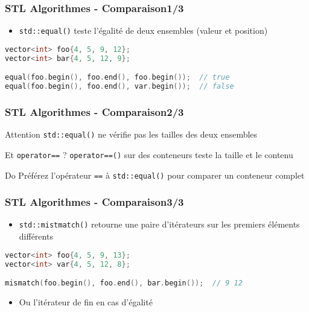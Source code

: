 \documentclass[C++.tex]{subfiles}
\begin{document}
\begin{frame}[fragile]
	\frametitle{STL Algorithmes - Comparaison\titlehfill{}1/3}
	\begin{itemize}
		\item \lstinline|std::equal()| teste l'égalité de deux ensembles (valeur et position)
	\end{itemize}


	\begin{lstlisting}[language=C++]
vector<int> foo{4, 5, 9, 12};
vector<int> bar{4, 5, 12, 9};

equal(foo.begin(), foo.end(), foo.begin());  // true
equal(foo.begin(), foo.end(), var.begin());  // false\end{lstlisting}
\end{frame}

\begin{frame}[fragile]
	\frametitle{STL Algorithmes - Comparaison\titlehfill{}2/3}
	\begin{alertblock}{Attention}
		\lstinline|std::equal()| ne vérifie pas les tailles des deux ensembles
	\end{alertblock}


	\begin{block}{Et \lstinline|operator==| ?}
		\lstinline|operator==()| sur des conteneurs teste la taille et le contenu
	\end{block}

	\begin{exampleblock}{Do}
		Préférez l'opérateur \lstinline|==| à \lstinline|std::equal()| pour comparer un conteneur complet
	\end{exampleblock}
\end{frame}

\begin{frame}[fragile]
	\frametitle{STL Algorithmes - Comparaison\titlehfill{}3/3}
	\begin{itemize}
		\item \lstinline|std::mistmatch()| retourne une paire d'itérateurs sur les premiers éléments différents
	\end{itemize}

	\begin{lstlisting}[language=C++]
vector<int> foo{4, 5, 9, 13};
vector<int> var{4, 5, 12, 8};

mismatch(foo.begin(), foo.end(), bar.begin());  // 9 12\end{lstlisting}

	\begin{itemize}
		\item Ou l'itérateur de fin en cas d'égalité
	\end{itemize}
\end{frame}
\end{document}
